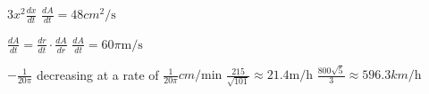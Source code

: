 \begin{Answer}[ref={exRelatedRates}]
	\Question %
	$3 x^{2} \frac{d x}{d t}$
\Question %
$\frac{d A}{d t} =48 cm^{2}/\mbox{s}$ 
\Question 
\begin{tasks}
	\task  %
	$ \frac{dA}{dt} =\frac{dr}{dt}\cdot \frac{dA}{dr}$
	\task  %
	$\frac{d A}{d t} =60 \pi  \mathrm{m}/\mbox{s}$
\end{tasks}

\Question %
$ -\frac{1}{20 \pi }$ decreasing at a rate of $\frac{1}{20 \pi } cm/\mbox{min}$ 
\Question %
$\frac{215}{\sqrt{101}} \approx 21.4 \mathrm{m}/\mbox{h}$ 
\Question %
$\frac{800 \sqrt{5}}{3} \approx 596.3 km/\mbox{h}$	
\end{Answer}%


